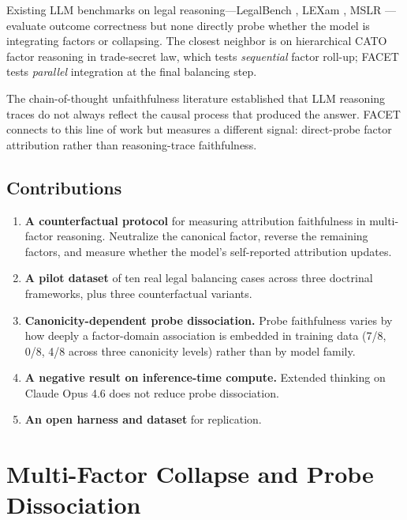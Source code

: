 \documentclass[11pt,twocolumn]{article}
\begin{document}
Existing LLM benchmarks on legal reasoning---LegalBench \citep{guha2023}, LEXam \citep{katz2025}, MSLR \citep{yu2025}---evaluate outcome correctness but none directly probe whether the model is integrating factors or collapsing. The closest neighbor is \citet{zhang2025} on hierarchical CATO factor reasoning in trade-secret law, which tests \emph{sequential} factor roll-up; FACET tests \emph{parallel} integration at the final balancing step.

The chain-of-thought unfaithfulness literature \citep{turpin2023,lanham2023} established that LLM reasoning traces do not always reflect the causal process that produced the answer. FACET connects to this line of work but measures a different signal: direct-probe factor attribution rather than reasoning-trace faithfulness.

\subsection{Contributions}

\begin{enumerate}
\item \textbf{A counterfactual protocol} for measuring attribution faithfulness in multi-factor reasoning. Neutralize the canonical factor, reverse the remaining factors, and measure whether the model's self-reported attribution updates.
\item \textbf{A pilot dataset} of ten real legal balancing cases across three doctrinal frameworks, plus three counterfactual variants.
\item \textbf{Canonicity-dependent probe dissociation.} Probe faithfulness varies by how deeply a factor-domain association is embedded in training data (7/8, 0/8, 4/8 across three canonicity levels) rather than by model family.
\item \textbf{A negative result on inference-time compute.} Extended thinking on Claude Opus 4.6 does not reduce probe dissociation.
\item \textbf{An open harness and dataset} for replication.
\end{enumerate}

\section{Multi-Factor Collapse and Probe Dissociation}
\end{document}
